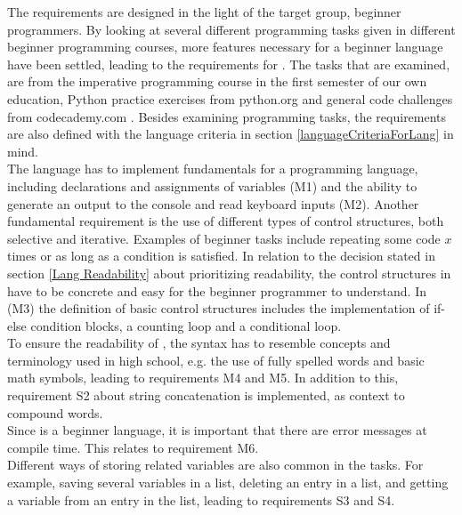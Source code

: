 The requirements are designed in the light of the target group, beginner programmers. By looking at several different programming tasks given in different beginner programming courses, more features necessary for a beginner language have been settled, leading to the requirements for \lang. The tasks that are examined, are from the imperative programming course in the first semester of our own education\cite{C-CourseExercises}, Python practice exercises from python.org\cite{PythonBasicsExercise} and general code challenges from codecademy.com \cite{CodeAcademyExercises}. Besides examining programming tasks, the requirements are also defined with the language criteria in section \ref{languageCriteriaForLang} in mind.\\

The language has to implement fundamentals for a programming language, including declarations and assignments of variables (M1) and the ability to generate an output to the console and read keyboard inputs (M2). Another fundamental requirement is the use of different types of control structures, both selective and iterative. Examples of beginner tasks include repeating some code $x$ times or as long as a condition is satisfied. In relation to the decision stated in section \ref{Lang Readability} about \lang prioritizing readability, the control structures in \lang have to be concrete and easy for the beginner programmer to understand. In (M3) the definition of basic control structures includes the implementation of if-else condition blocks, a counting loop and a conditional loop. \\ 

To ensure the readability of \lang, the syntax has to resemble concepts and terminology used in high school, e.g. the use of fully spelled words and basic math symbols, leading to requirements M4 and M5. In addition to this, requirement S2 about string concatenation is implemented, as context to compound words. \\

Since \lang is a beginner language, it is important that there are error messages at compile time. This relates to requirement M6.
\\

Different ways of storing related variables are also common in the tasks. For example, saving several variables in a list, deleting an entry in a list, and getting a variable from an entry in the list, leading to requirements S3 and S4. 
\\

